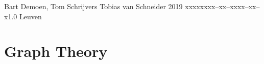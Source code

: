 \documentclass{tstextbook}
\begin{document}
       {Bart Demoen, Tom Schrijvers}
       {Tobias van Schneider}
       {2019}
       {xxxxx}{xxx--xx--xxxx--xx--x}{1.0}
       {}
       {Leuven}





\part{Graph Theory}

\graphicspath{{./GraphTheory/figures/}}



% 
% 
% 
% 
% 
% 
% 
% 
% 
% 
% 
\end{document}
